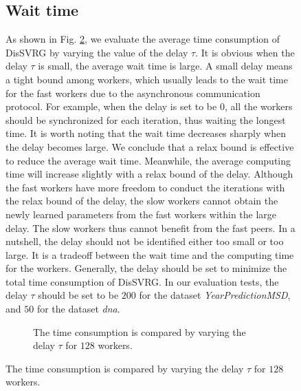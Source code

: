 \documentclass[preprint,review,11pt,a4paper]{elsarticle}
\begin{document}
\begin{figure}
\subsection{Wait time}
As shown in Fig. \ref{figure_evaluation3_delay}, we evaluate the average time consumption of DisSVRG by varying the value of the delay $\tau$. It is obvious when the delay $\tau$ is small, the average wait time is large. A small delay means a tight bound among workers, which usually leads to the wait time for the fast workers due to the asynchronous communication protocol. For example, when the delay is set to be $0$, all the workers should be synchronized for each iteration, thus waiting the longest time. It is worth noting that the wait time decreases sharply when the delay becomes large. We conclude that a relax bound is effective to reduce the average wait time. Meanwhile, the average computing time will increase slightly with a relax bound of the delay. Although the fast workers have more freedom to conduct the iterations with the relax bound of the delay, the slow workers cannot obtain the newly learned parameters from the fast workers within the large delay. The slow workers thus cannot  benefit from the fast peers. In a nutshell, the delay should not be identified either too small or too large. It is a tradeoff between the wait time and the computing time for the workers. Generally, the delay should be set to minimize the total time consumption of DisSVRG. In our evaluation tests, the delay $\tau$ should be set to be  $200$ for the dataset \emph{YearPredictionMSD}, and $50$ for the dataset \emph{dna}.

\begin{figure}
\centering
{}
\caption{The time consumption is compared by varying the delay $\tau$ for $128$ workers.}
\label{figure_evaluation3_delay}
\end{figure}


\end{figure}
\end{document}

